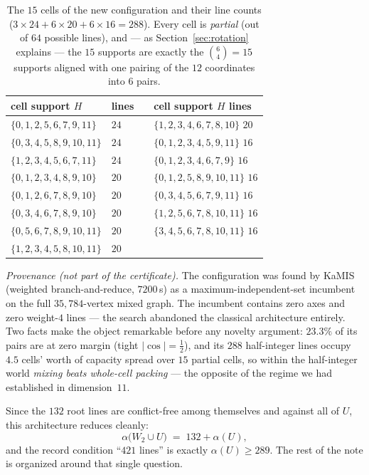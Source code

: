 \documentclass[11pt]{article}
\theoremstyle{remark}
\begin{document}
\begin{table}[h]
\centering
\begin{tabular}{@{}llcl@{}}
\toprule
cell support $H$ & lines & \quad & cell support $H$ \quad lines \\
\midrule
$\{0,1,2,5,6,7,9,11\}$   & $24$ & & $\{1,2,3,4,6,7,8,10\}$ \quad $20$ \\
$\{0,3,4,5,8,9,10,11\}$  & $24$ & & $\{0,1,2,3,4,5,9,11\}$ \quad $16$ \\
$\{1,2,3,4,5,6,7,11\}$   & $24$ & & $\{0,1,2,3,4,6,7,9\}$  \quad $16$ \\
$\{0,1,2,3,4,8,9,10\}$   & $20$ & & $\{0,1,2,5,8,9,10,11\}$ \quad $16$ \\
$\{0,1,2,6,7,8,9,10\}$   & $20$ & & $\{0,3,4,5,6,7,9,11\}$ \quad $16$ \\
$\{0,3,4,6,7,8,9,10\}$   & $20$ & & $\{1,2,5,6,7,8,10,11\}$ \quad $16$ \\
$\{0,5,6,7,8,9,10,11\}$  & $20$ & & $\{3,4,5,6,7,8,10,11\}$ \quad $16$ \\
$\{1,2,3,4,5,8,10,11\}$  & $20$ & & \\
\bottomrule
\end{tabular}
\caption{The $15$ cells of the new configuration and their line counts
($3\times24+6\times20+6\times16=288$). Every cell is \emph{partial} (out
of $64$ possible lines), and --- as Section~\ref{sec:rotation} explains ---
the $15$ supports are exactly the $\binom{6}{4}=15$ supports aligned with
one pairing of the $12$ coordinates into $6$ pairs.}
\label{tab:cells}
\end{table}

\emph{Provenance (not part of the certificate).} The configuration was
found by KaMIS \cite{KaMIS17} (weighted branch-and-reduce, $7200$\,s) as a
maximum-independent-set incumbent on the full $35{,}784$-vertex mixed
graph. The incumbent contains zero axes and zero weight-$4$ lines --- the
search abandoned the classical architecture entirely. Two facts make the
object remarkable before any novelty argument: $23.3\%$ of its pairs are at
zero margin (tight $|\cos|=\tfrac12$), and its $288$ half-integer lines
occupy $4.5$ cells' worth of capacity spread over $15$ partial cells, so
within the half-integer world \emph{mixing beats whole-cell packing} ---
the opposite of the regime we had established in dimension~$11$.

Since the $132$ root lines are conflict-free among themselves and against
all of $U$, this architecture reduces cleanly:
\begin{equation}\label{eq:reduction}
\alpha\bigl(W_2\cup U\bigr)\;=\;132+\alpha(U),
\end{equation}
and the record condition ``$421$ lines'' is exactly $\alpha(U)\ge 289$.
The rest of the note is organized around that single question.
\end{document}
